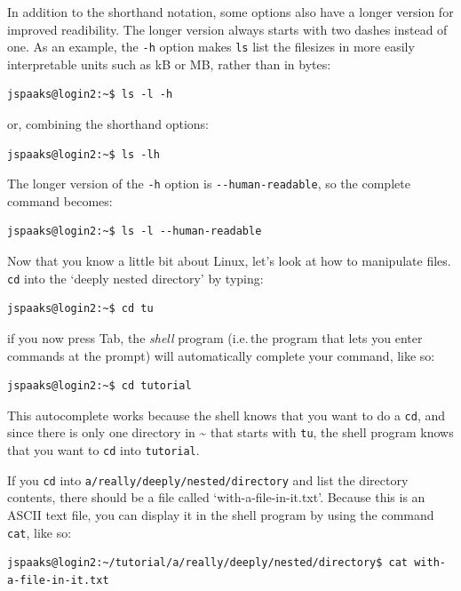 In addition to the shorthand notation, some options also have a longer version for improved readibility. The longer version always starts with two dashes instead of one. As an example, the \lstinline[style=bashinline]{-h} option makes \lstinline[style=bashinline]{ls} list the filesizes in more easily interpretable units such as kB or MB, rather than in bytes:
\begin{lstlisting}[style=basic,style=bash]
jspaaks@login2:~$ ls -l -h
\end{lstlisting}
or, combining the shorthand options:
\begin{lstlisting}[style=basic,style=bash]
jspaaks@login2:~$ ls -lh
\end{lstlisting}
The longer version of the \lstinline[style=bashinline]{-h} option is \lstinline[style=bashinline]{--human-readable}, so the complete command becomes:
\begin{lstlisting}[style=basic,style=bash]
jspaaks@login2:~$ ls -l --human-readable
\end{lstlisting}


Now that you know a little bit about Linux, let's look at how to manipulate files. \lstinline[style=bashinline]{cd} into the `deeply nested directory' by typing:
\begin{lstlisting}[style=basic,style=bash]
jspaaks@login2:~$ cd tu
\end{lstlisting}
if you now press Tab, the \textit{shell} program (i.e.\,the program that lets you enter commands at the prompt) will automatically complete your command, like so:
\begin{lstlisting}[style=basic,style=bash]
jspaaks@login2:~$ cd tutorial
\end{lstlisting}
This autocomplete works because the shell knows that you want to do a \lstinline[style=bashinline]{cd}, and since there is only one directory in \textasciitilde{} that starts with \lstinline[style=bashinline]{tu}, the shell program knows that you want to \lstinline[style=bashinline]{cd} into \lstinline[style=bashinline]{tutorial}.

If you \lstinline[style=bashinline]{cd} into \lstinline{a/really/deeply/nested/directory} and list the directory contents, there should be a file called `with-a-file-in-it.txt'. Because this is an \mbox{ASCII} text file, you can display it in the shell program by using the command \lstinline[style=bashinline]{cat}, like so:
\begin{lstlisting}[style=basic,style=bash]
jspaaks@login2:~/tutorial/a/really/deeply/nested/directory$ cat with-a-file-in-it.txt
\end{lstlisting}

